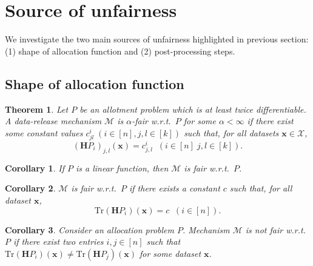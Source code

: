 \documentclass[9pt,lineno,twocolumn,twoside]{pnas-new}
\newcommand{\cM}{\mathcal{M}}
\newcommand{\cX}{\mathcal{X}}
\newtheorem{corollary}{Corollary}
\newtheorem{theorem}{Theorem}
\begin{document}
    \section*{Source of unfairness}
    We investigate the two main sources of unfairness highlighted in previous section: (1) shape of allocation function and (2) post-processing steps.
    \subsection*{Shape of allocation function}

    \begin{theorem}
        \label{lem:fair_bound_allottments}
        Let $P$ be an allotment problem which is at least twice differentiable.
        A data-release mechanism $\cM$ is $\alpha$-fair w.r.t.~$P$ for some
        $\alpha < \infty$ if there exist some constant values
        $c^i_{jl} \; (i \in [n], j,l \in [k])$ such that, for all datasets $\bm{x} \in \cX$,
        \[
            (\bm{H}P_i)_{j,l}(\bm{x}) = c^i_{j,l}   \;\; (i\in[n]\; j,l\in[k]).
        \]
    \end{theorem}

    \begin{corollary}
        \label{cor:2}
        If $P$ is a linear function, then $\cM$ is fair w.r.t.~$P$.
    \end{corollary}


    \begin{corollary}
        \label{cor:3}
        $\cM$ is fair w.r.t.~$P$ if there exists a constant $c$ such that,
        for all dataset $\bm{x}$,
        \[
            \mbox{Tr}(\bm{H}P_i)(\bm{x}) = c \;\; (i \in [n]).
        \]
    \end{corollary}

    \begin{corollary}
        Consider an allocation problem $P$. Mechanism $\cM$ is not fair
        w.r.t.~$P$ if there exist two entries $i, j \in [n]$ such that
        $\mbox{Tr}(\bm{H}P_i)(\bm{x}) \neq \mbox{Tr}(\bm{H}P_j)(\bm{x})$ for some dataset
        $\bm{x}$.
    \end{corollary}
\end{document}
